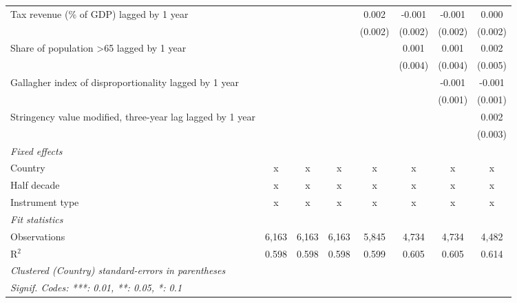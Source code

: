\begin{tabular}{lccccccc}
   Tax revenue (\% of GDP) lagged by 1 year                              &               &              &              & 0.002   & -0.001  & -0.001  & 0.000\\   
                                                                         &               &              &              & (0.002) & (0.002) & (0.002) & (0.002)\\   
   Share of population >65 lagged by 1 year                              &               &              &              &         & 0.001   & 0.001   & 0.002\\   
                                                                         &               &              &              &         & (0.004) & (0.004) & (0.005)\\   
   Gallagher index of disproportionality lagged by 1 year                &               &              &              &         &         & -0.001  & -0.001\\   
                                                                         &               &              &              &         &         & (0.001) & (0.001)\\   
   Stringency value modified, three-year lag lagged by 1 year            &               &              &              &         &         &         & 0.002\\   
                                                                         &               &              &              &         &         &         & (0.003)\\   
   \emph{Fixed effects}\\
   Country                                                               & x             & x            & x            & x       & x       & x       & x\\  
   Half decade                                                           & x             & x            & x            & x       & x       & x       & x\\  
   Instrument type                                                       & x             & x            & x            & x       & x       & x       & x\\  
   \midrule \emph{Fit statistics}\\
   Observations                                                          & 6,163         & 6,163        & 6,163        & 5,845   & 4,734   & 4,734   & 4,482\\  
   R$^2$                                                                 & 0.598         & 0.598        & 0.598        & 0.599   & 0.605   & 0.605   & 0.614\\  
   \midrule
   \multicolumn{8}{l}{\emph{Clustered (Country) standard-errors in parentheses}}\\
   \multicolumn{8}{l}{\emph{Signif. Codes: ***: 0.01, **: 0.05, *: 0.1}}\\
\end{tabular}
\par\endgroup


